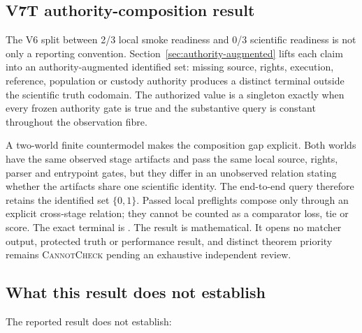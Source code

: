 \subsection{V7T authority-composition result}

The V6 split between 2/3 local smoke readiness and 0/3 scientific readiness is
not only a reporting convention.  Section~\ref{sec:authority-augmented} lifts
each claim into an authority-augmented identified set: missing source, rights,
execution, reference, population or custody authority produces a distinct
terminal outside the scientific truth codomain.  The authorized value is a
singleton exactly when every frozen authority gate is true and the substantive
query is constant throughout the observation fibre.

A two-world finite countermodel makes the composition gap explicit.  Both
worlds have the same observed stage artifacts and pass the same local source,
rights, parser and entrypoint gates, but they differ in an unobserved relation
stating whether the artifacts share one scientific identity.  The end-to-end
query therefore retains the identified set $\{0,1\}$.  Passed local preflights
compose only through an explicit cross-stage relation; they cannot be counted
as a comparator loss, tie or score.  The exact terminal is
.
The result is mathematical.  It opens no matcher output, protected truth or
performance result, and distinct theorem priority remains
\textsc{CannotCheck} pending an exhaustive independent review.

\subsection{What this result does not establish}

The reported result does not establish:

